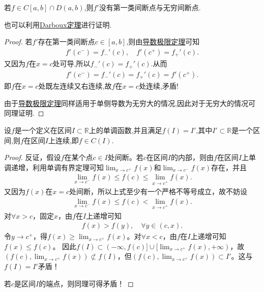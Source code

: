 \documentclass[../../main.tex]{subfiles}%
\begin{document}
\begin{proposition}\label{proposition:导函数没有第一类间断点与无穷间断点}
若$f\in C[a,b]\cap D(a,b)$,则$f'$没有第一类间断点与无穷间断点.
\end{proposition}
\begin{remark}
也可以利用\hyperref[theorem:导数介值定理]{Darboux定理}进行证明.
\end{remark}
\begin{proof}
若$f'$存在第一类间断点$c\in [a,b]$,则由\hyperref[theorem:导数极限定理]{导数极限定理}可知
\begin{align*}
f' \left( c^- \right) =f_{-}'\left( c \right) ,\quad f' \left( c^+ \right) =f_{+}'\left( c \right) .
\end{align*}
又因为$f$在$x=c$处可导,所以$f_{-}'\left( c \right) =f_{+}'\left( c \right)$.从而\
\begin{align*}
f' \left( c^- \right) =f_{-}'\left( c \right) =f_{+}'\left( c \right) =f'\left( c^+ \right) .
\end{align*}
即$f$在$x=c$处既左连续又右连续,故$f$在$x=c$处连续,矛盾!

由于\hyperref[theorem:导数极限定理]{导数极限定理}同样适用于单侧导数为无穷大的情况,因此对于无穷大的情况可同理证明.
\end{proof}

\begin{proposition}\label{proposition:定义是区间的单调函数值域还是区间就必是连续函数}
设$f$是一个定义在区间$I\subset \mathbb{R}$上的单调函数,并且满足$f(I)=I'$,其中$I'\subset \mathbb{R}$是一个区间,则$f$在区间$I$上连续,即$f\in C(I)$.
\end{proposition}
\begin{proof}
反证，假设$f$在某个点$c\in I$处间断。若$c$在区间$I$的内部，则由$f$在区间$I$上单调递增，利用单调有界定理可知$\lim_{x\rightarrow c^+}f(x)$和$\lim_{x\rightarrow c^-}f(x)$存在，并且
\begin{align*}
\lim_{x\rightarrow c^-}f(x) \leqslant f(c) \leqslant \lim_{x\rightarrow c^+}f(x).
\end{align*}
又因为$f(x)$在$x=c$处间断，所以上式至少有一个严格不等号成立，故不妨设
\begin{align*}
\lim_{x\rightarrow c^-}f(x) \leqslant f(c) < \lim_{x\rightarrow c^+}f(x).
\end{align*}
对$\forall x>c$，固定$x$，由$f$在$I$上递增可知
\begin{align*}
f(x) > f(y), \quad \forall y \in (c, x).
\end{align*}
令$y\rightarrow c^+$，得$f(x) \geqslant \lim_{x\rightarrow c^+}f(x)$。对$\forall x<c$，由$f$在$I$上递增可知$f(x) \leqslant f(c)$。
因此$f(I) \subset (-\infty, f(c)] \cup [\lim_{x\rightarrow c^+}f(x), +\infty)$，故$(f(c), \lim_{x\rightarrow c^+}f(x)) \not\subset f(I)$，但$(f(c), \lim_{x\rightarrow c^+}f(x)) \subset I'$。这与$f(I) = I'$矛盾！

若$c$是区间$I$的端点，则同理可得矛盾！
\end{proof}
\end{document}
